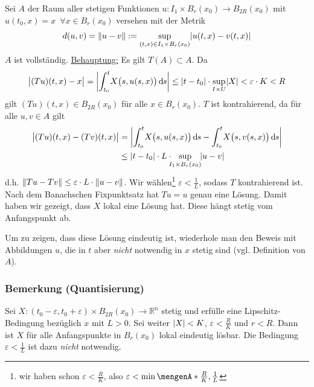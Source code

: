 Sei $A$ der Raum aller stetigen Funktionen $u : I_1 \times B_r(x_0) \to B_{2R}(x_0)$ mit $u(t_0, x) = x \enspace \forall x \in B_r(x_0)$ versehen mit der Metrik
\[
	d(u,v) = \norm{u -v} := \sup_{(t,x)\in I_1 \times B_r(x_0)} \abs*{u(t,x)- v(t,x)} 
\]
$A$ ist vollständig. \uline{Behauptung:} Es gilt $T(A) \subset A$. Da
\begin{align*}
	\abs[\big]{(T u)(t,x) - x} = \abs*{ \int_{t_0} ^{t} \! X \enbrace[\big]{s, u(s,x)}  \, \mathd s  }  \le \abs*{t- t_0}\cdot \sup_{I \times U} \abs*{X}  
	< \varepsilon \cdot K < R 
\end{align*}
gilt $(T u)(t,x) \in B_{2 R}(x_0)$ für alle $x \in B_r(x_0)$. $T$ ist kontrahierend, da für alle $u,v \in A$ gilt
\begin{align*}
	\abs[\big]{(T u)(t,x)- (T v)(t,x)} &= \abs*{\int_{t_0} ^{t} \! X \enbrace[\big]{s, u(s,x)} \, \mathd s - \int_{t_0} ^{t} \!X \enbrace[\big]{s, v(s,x)}\, 
	\mathd s} \\
	&\le \abs*{t- t_0} \cdot L \cdot \! \!\! \sup_{I_1 \times B_r(x_0)} \!\abs*{u-v}    
\end{align*}
d.h. $\norm{T u - T v} \le \varepsilon \cdot L \cdot \norm{u-v}$. Wir wählen\footnote{wir haben schon $\varepsilon < \frac{R}{K}$, also 
$\varepsilon < \min \set{\frac{R}{K}, \frac{1}{L}} $} $\varepsilon < \frac{1}{L}$, sodass $T$ kontrahierend ist. Nach dem Banachschen Fixpunktsatz
hat $T u = u$ genau eine Lösung. Damit haben wir gezeigt, dass $X$ lokal eine Lösung hat. Diese hängt stetig vom Anfangspunkt ab. 

Um zu zeigen, dass diese Lösung eindeutig
ist, wiederhole man den Beweis mit Abbildungen $u$, die in $t$ aber \emph{nicht} notwendig in $x$ stetig sind (vgl. Definition von $A$). \bewende

\subsubsection{Bemerkung (Quantisierung)} %
\label{ssub:232}
Sei $X : (t_0 - \varepsilon, t_0 +\varepsilon) \times B_{2R}(x_0) \to \mathds{R}^n$ stetig und erfülle eine Lipschitz-Bedingung bezüglich $x$ mit $L >0$. Sei weiter 
$\abs*{X} < K $, $\varepsilon < \frac{R}{K}$ und $r < R$. Dann ist $X$ für alle Anfangspunkte in $B_r(x_0)$ lokal eindeutig lösbar. Die Bedingung 
$\varepsilon < \frac{1}{L} $ ist dazu \emph{nicht} notwendig.

